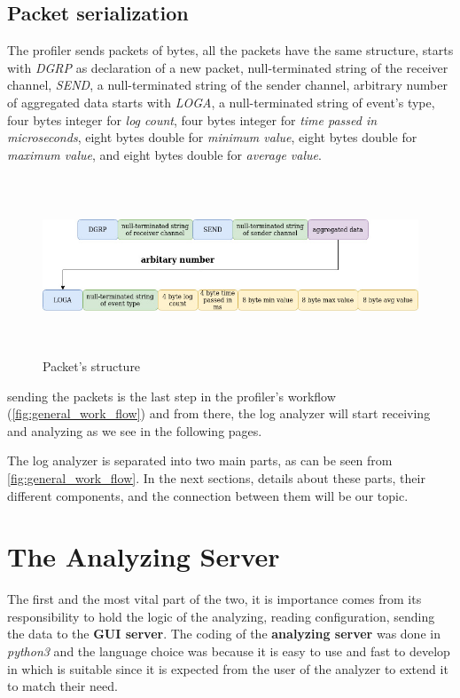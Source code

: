 \subsection{Packet serialization}\label{sec:packet_serialization}
The profiler sends packets of bytes, all the packets have the same structure, starts with \textit{DGRP}
as declaration of a new packet, null-terminated string of the receiver channel, 
\textit{SEND}, a null-terminated string of the sender channel, arbitrary number of aggregated data starts
with \textit{LOGA}, a null-terminated string of event's type, four bytes integer for \textit{log count}, 
four bytes integer for \textit{time passed in microseconds}, eight bytes double for \textit{minimum value}, 
eight bytes double for \textit{maximum value}, and eight bytes double for \textit{average value}.
\newline
\begin{figure}[H]
	\centering
	\includegraphics[width=1.0\textwidth,height=200px]{images/packet.jpg}
	\caption{Packet's structure}
	\label{fig:packet_structure}
\end{figure}

sending the packets is the last step in the profiler's workflow (\ref{fig:general_work_flow}) 
and from there, the log analyzer will start receiving and analyzing as we see in the following pages.

The log analyzer is separated into two main parts, as can be seen from \ref{fig:general_work_flow}.
In the next sections, details about these parts, their different components, and the connection between
them will be our topic.

\section{The Analyzing Server}
The first and the most vital part of the two, it is importance comes from its responsibility
to hold the logic of the analyzing, reading configuration, sending the data to the \textbf{GUI server}.
The coding of the \textbf{analyzing server} was done in \textit{python3} and the language choice was because
it is easy to use and fast to develop in which is suitable since it is expected from the user of the
analyzer to extend it to match their need.


